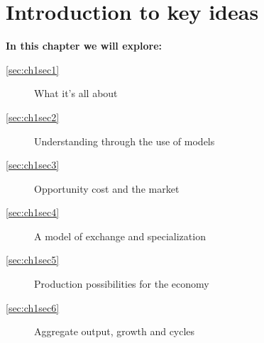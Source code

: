 \chapter{Introduction to key ideas}\label{chap:intro}

\begin{topics}
	\textbf{In this chapter we will explore:}
	\begin{description}
		\item[\ref{sec:ch1sec1}] What it's all about
		\item[\ref{sec:ch1sec2}] Understanding through the use of models
		\item[\ref{sec:ch1sec3}] Opportunity cost and the market
		\item[\ref{sec:ch1sec4}] A model of exchange and specialization
		\item[\ref{sec:ch1sec5}] Production possibilities for the economy
		\item[\ref{sec:ch1sec6}] Aggregate output, growth and cycles
	\end{description}
\end{topics}